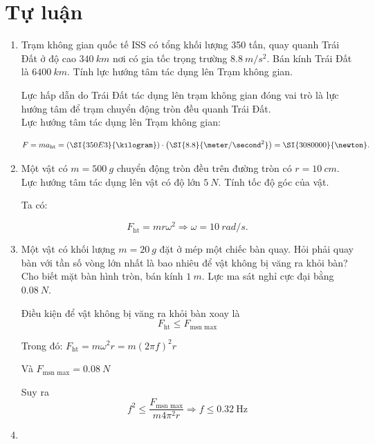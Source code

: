 \section{Tự luận}
\begin{enumerate}[label=\bfseries Câu \arabic*:]
	\item {}
	
	
	{
		Trạm không gian quốc tế ISS có tổng khối lượng 350 tấn, quay quanh Trái Đất ở độ cao $\SI{340}{km}$ nơi có gia tốc trọng trường $\SI{8,8}{m/s^2}$. Bán kính Trái Đất là $\SI{6400}{km}$. Tính lực hướng tâm tác dụng lên Trạm không gian.
	}
	
	\hideall
	{	Lực hấp dẫn do Trái Đất tác dụng lên trạm không gian đóng vai trò là lực hướng tâm để trạm chuyển động tròn đều quanh Trái Đất.\\
		Lực hướng tâm tác dụng lên Trạm không gian:
		
		$$F = ma_\text{ht} = \left(\SI{350E3}{\kilogram}\right)\cdot\left(\SI{8.8}{\meter/\second^2}\right)=\SI{3080000}{\newton}.$$
	}

\item {}


{
	Một vật có $m = \SI{500}{g}$ chuyển động tròn đều trên đường tròn có $r = \SI{10}{cm}$. Lực hướng tâm tác dụng lên vật có độ lớn $\SI{5}{N}$. Tính tốc độ góc của vật.
}

\hideall
{	
	
	Ta có: 
	
	$$F_\text{ht} = mr\omega^2 \Rightarrow \omega = \SI{10}{rad/s}.$$
	
}
	
	\item {}
	
	
	{
		Một vật có khối lượng $m=\SI{20}{g}$ đặt ở mép một chiếc bàn quay. Hỏi phải quay bàn với tần số vòng lớn nhất là bao nhiêu để vật không bị văng ra khỏi bàn? Cho biết mặt bàn hình tròn, bán kính $\SI{1}{m}$. Lực ma sát nghỉ cực đại bằng $\SI{0.08}{N}$.
	}
	
	\hideall
	{	
		Điều kiện để vật không bị văng ra khỏi bàn xoay là
		$$F_\text{ht} \leq F_\text{msn max}$$
		
		Trong đó: $F_\text{ht} = m\omega^2 r = m (2\pi f)^2 r$
		
		Và $F_\text{msn max} = \SI{0.08}{N}$
		
		Suy ra $$f^2 \leq \dfrac{F_\text{msn max}}{m 4 \pi ^2 r}\Rightarrow f\leq \SI{0.32}{\hertz}$$
	}
	\item {}
	

\end{enumerate}
